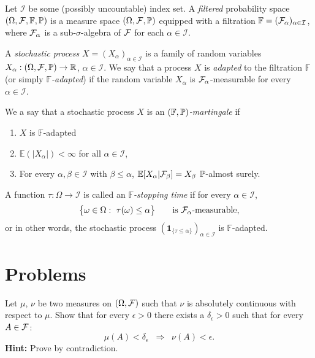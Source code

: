 Let $\mathcal{I}$ be some (possibly uncountable) index set. A \emph{filtered} probability space $(\Omega, \mathcal F, \mathbb{F}, \mathbb P)$ is a measure space $(\Omega, \mathcal F, \mathbb P)$ equipped with a filtration $\mathbb{F}=(\mathcal F_\alpha)_{\alpha\in\mathcal{I}}$, where $\mathcal F_\alpha$ is a sub-$\sigma$-algebra of $\mathcal F$ for each $\alpha\in\mathcal{I}$.

A \emph{stochastic process} $X=(X_\alpha)_{\alpha\in\mathcal{I}}$ is a family of random variables $X_\alpha : (\Omega, \mathcal F, \mathbb P) \to \mathbb{R}$, $\alpha\in\mathcal{I}$. We say that a process $X$ is \emph{adapted} to the filtration $\mathbb{F}$ (or simply \emph{$\mathbb{F}$-adapted}) if the random variable $X_\alpha$ is $\mathcal F_\alpha$-measurable for every $\alpha \in \mathcal{I}$. 

We a say that a stochastic process $X$ is an \emph{$(\mathbb{F},\mathbb P)$-martingale} if
\begin{enumerate}
\item $X$ is $\mathbb{F}$-adapted
\item $\mathbb{E}(|X_\alpha|) < \infty$ for all $\alpha \in \mathcal{I}$,
\item For every $\alpha,\beta\in\mathcal{I}$ with $\beta\le \alpha$, $\mathbb{E}[X_\alpha | \mathcal F_{\beta}] = X_{\beta}$ $\mathbb P$-almost surely.
\end{enumerate}

A function $\tau:\Omega \to \mathcal{I}$ is called an \emph{$\mathbb{F}$-stopping time} if for every $\alpha \in \mathcal{I}$, 
\[
	\bigl\{ \omega\in\Omega : \ \tau(\omega) \leq \alpha \bigr\}\qquad\text{is $\mathcal F_\alpha$-measurable},
\]
or in other words, the stochastic process $(\mathbf{1}_{\{\tau\le \alpha\}})_{\alpha\in\mathcal{I}}$ is $\mathbb{F}$-adapted.


\section{Problems}

\begin{problem}
	Let $\mu$, $\nu$ be two measures on $(\Omega, \mathcal F)$ such that $\nu$ is absolutely continuous with respect to $\mu$. Show that for every $\epsilon > 0$ there exists a $\delta_\epsilon > 0$ such that for every $A \in \mathcal F$:
	\[
		\mu(A) < \delta_\epsilon\;\;\Longrightarrow\;\; \nu(A) < \epsilon.
	\]
	\textbf{Hint:} Prove by contradiction.
\end{problem}


